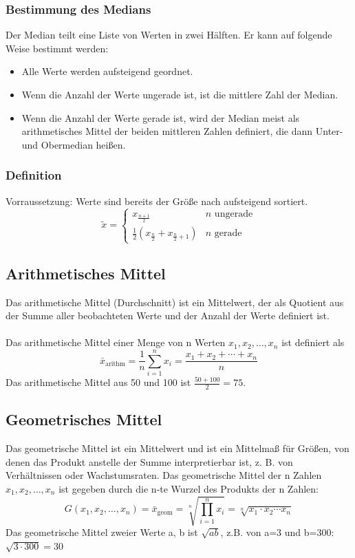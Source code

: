 \documentclass[a4paper]{article}
\begin{document}
\subsubsection{Bestimmung des Medians}
Der Median teilt eine Liste von Werten in zwei Hälften. Er kann auf folgende Weise bestimmt werden:
\begin{itemize}
\item Alle Werte werden aufsteigend geordnet.
\item Wenn die Anzahl der Werte ungerade ist, ist die mittlere Zahl der Median.
\item Wenn die Anzahl der Werte gerade ist, wird der Median meist als arithmetisches Mittel der beiden mittleren Zahlen definiert, die dann Unter- und Obermedian heißen.
\end{itemize}
\subsubsection{Definition}
Vorraussetzung: Werte sind bereits der Größe nach aufsteigend sortiert.
\[ \tilde x =\begin{cases} x_\frac{n+1}{2} & n\text{ ungerade}\\ \frac {1}{2}\left(x_{\frac{n}{2}} + x_{\frac{n}{2} + 1}\right) & n \text{ gerade} \end{cases} \]

\subsection{Arithmetisches Mittel}
Das arithmetische Mittel (Durchschnitt) ist ein Mittelwert, der als Quotient aus der Summe aller beobachteten Werte und der Anzahl der Werte definiert ist. \\\\
Das arithmetische Mittel einer Menge von n Werten $x_1, x_2, \ldots , x_n$ ist definiert als
\[ \bar{x}_{\mathrm{arithm}} = \frac{1}{n} \sum_{i=1}^n{x_i} = \frac{x_1 + x_2 + \cdots + x_n}{n} \]
Das arithmetische Mittel aus 50 und 100 ist  $\tfrac{50+100}{2} = 75$.

\subsection{Geometrisches Mittel}
Das geometrische Mittel ist ein Mittelwert und ist ein Mittelmaß für Größen, von denen das Produkt anstelle der Summe interpretierbar ist, z. B. von Verhältnissen oder Wachstumsraten. Das geometrische Mittel der n Zahlen $x_1,x_2,\dotsc,x_n$ ist gegeben durch die n-te Wurzel des Produkts der n Zahlen:
\[ G(x_1,x_2,\dotsc,x_n)= \bar{x}_\mathrm{geom} = \sqrt[n]{\prod_{i=1}^n{x_i}} = \sqrt[n]{x_1 \cdot x_2 \dotsm x_n} 
\]
Das geometrische Mittel zweier Werte a, b ist $\sqrt{ab}$, z.B. von a=3 und b=300: $\sqrt{3 \cdot 300} = 30$
\end{document}
